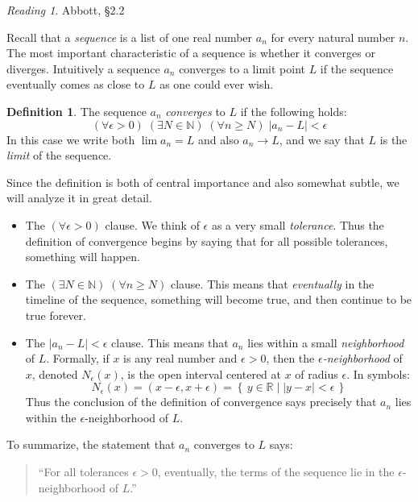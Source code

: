 \documentclass[11pt,oneside]{amsbook}
\newcommand{\set}[1]{\left\{\,#1\,\right\}}
\newcommand{\N}{\mathbb N}
\newcommand{\R}{\mathbb R}
\theoremstyle{definition}
\theoremstyle{plain}
\theoremstyle{definition}
\newtheorem{definition}[theorem]{Definition}
\theoremstyle{remark}
\newtheorem*{reading}{Reading}
\numberwithin{equation}{section}
\numberwithin{figure}{section}
\begin{document}
\begin{reading}
  Abbott, \S 2.2
\end{reading}

Recall that a \emph{sequence} is a list of one real number $a_n$ for every natural number $n$. The most important characteristic of a sequence is whether it converges or diverges. Intuitively a sequence $a_n$ converges to a limit point $L$ if the sequence eventually comes as close to $L$ as one could ever wish.

\begin{definition}
  The sequence $a_n$ \emph{converges} to $L$ if the following holds:
  \[(\forall\epsilon>0)\;(\exists N\in\N)\;(\forall n\geq N)\;|a_n-L|<\epsilon
  \]
  In this case we write both $\lim a_n=L$ and also $a_n\to L$, and we say that $L$ is the \emph{limit} of the sequence.
\end{definition}

Since the definition is both of central importance and also somewhat subtle, we will analyze it in great detail.

\begin{itemize}
  \item The $(\forall\epsilon>0)$ clause. We think of $\epsilon$ as a very small \emph{tolerance}. Thus the definition of convergence begins by saying that for all possible tolerances, something will happen.
  \item The $(\exists N\in\N)\;(\forall n\geq N)$ clause. This means that \emph{eventually} in the timeline of the sequence, something will become true, and then continue to be true forever.
  \item The $|a_n-L|<\epsilon$ clause. This means that $a_n$ lies within a small \emph{neighborhood} of $L$. Formally, if $x$ is any real number and $\epsilon>0$, then the \emph{$\epsilon$-neighborhood} of $x$, denoted $N_\epsilon(x)$, is the open interval centered at $x$ of radius $\epsilon$. In symbols:
  \[N_\epsilon(x)=(x-\epsilon,x+\epsilon)=\set{y\in\R\mid|y-x|<\epsilon}
  \]
  Thus the conclusion of the definition of convergence says precisely that $a_n$ lies within the $\epsilon$-neighborhood of $L$.
\end{itemize}

To summarize, the statement that $a_n$ converges to $L$ says:
\begin{quotation}
 ``For all tolerances $\epsilon>0$, eventually, the terms of the sequence lie in the $\epsilon$-neighborhood of $L$.''
\end{quotation}
\end{document}
